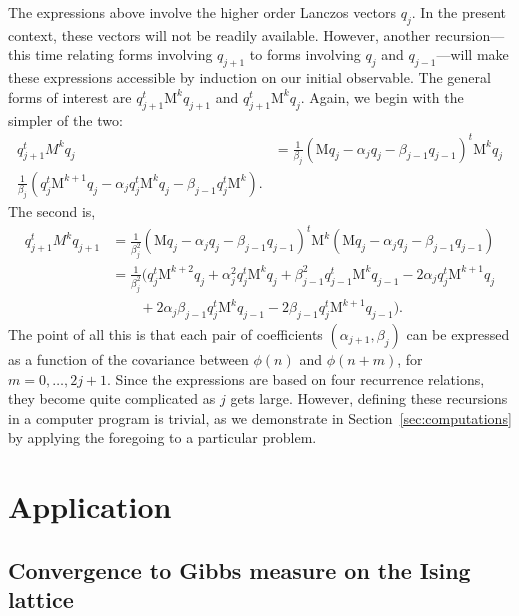 \documentclass[12pt,letterpaper]{report}
\theoremstyle{plain}
\theoremstyle{definition}
\theoremstyle{remark}
\numberwithin{theorem}{chapter}
\numberwithin{claim}{chapter}
\numberwithin{equation}{chapter}
\numberwithin{conjecture}{chapter}
\newcommand\M{\ensuremath{\mathrm{M}}}
\newcommand\<{\ensuremath{\langle}}
\renewcommand\>{\ensuremath{\rangle}}
\begin{document}
The expressions above involve the higher order Lanczos vectors $q_j$. In the present context,
these vectors will not be readily available. However, another recursion---this time relating forms
involving $q_{j+1}$ to forms involving $q_j$ and $q_{j-1} $---will make these
expressions accessible by induction on our initial observable. The general forms
of interest are $q_{j+1}^t\M^k q_{j+1}$ and $q^t_{j+1}\M^k q_j$. Again, we 
begin with the simpler of the two:
\begin{align*}
  q_{j+1}^tM^kq_j &= 
 \frac{1}{\beta_j}(\M q_j - \alpha_j q_j - \beta_{j-1} q_{j-1})^t\M^k q_j\\
 \frac{1}{\beta_j}(q_j^t\M^{k+1} q_j - \alpha_j q_j^t\M^{k} q_j -\beta_{j-1} q_j^t\M^k).
\end{align*}
The second is,
\begin{align}
\label{eq:4.12}
  q_{j+1}^tM^kq_{j+1} 
&=  \frac{1}{\beta_j^2}(\M q_j - \alpha_j q_j - \beta_{j-1} q_{j-1})^t\M^k 
  (\M q_j - \alpha_j q_j - \beta_{j-1} q_{j-1})\nonumber\\
&=  \frac{1}{\beta_j^2}(q_j^t\M^{k+2} q_j + \alpha^2_jq_j^t\M^{k} q_j 
  + \beta^2_{j-1} q_{j-1}^t\M^k q_{j-1} - 2\alpha_jq_j^t\M^{k+1} q_j \nonumber\\
& \qquad    
    + 2\alpha_j \beta_{j-1}q_j^t\M^k q_{j-1}
    - 2\beta_{j-1}q_j^t \M^{k+1}q_{j-1}).
\end{align}
The point of all this is that each pair of coefficients $(\alpha_{j+1}, \beta_j)$
can be expressed as a function of the covariance between 
$\phi(n)$ and $\phi(n+ m)$, for $m = 0, \dots, 2j+1$. Since the expressions
are based on four recurrence relations, they become quite complicated as $j$ gets large. However,
defining these recursions in a computer program is trivial, as we demonstrate
in Section~\ref{sec:computations} %
by applying the foregoing to a particular problem.
%
%
%
%





\part{Application\label{part:two}}%
\chapter{Convergence to Gibbs measure on the Ising lattice}
\label{cha:an-appl-conv}
\end{document}
